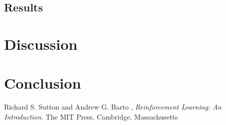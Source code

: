 \documentclass[a4paper,10pt]{article}
\begin{document}
\subsection{Results}







\section{Discussion}



\section{Conclusion}


\begin{thebibliography}{9}

  Richard S. Sutton and Andrew G. Barto ,
  \emph{Reinforcement Learning: An Introduction}.
  The MIT Press, Cambridge, Massachusetts

\end{thebibliography}
\end{document}
